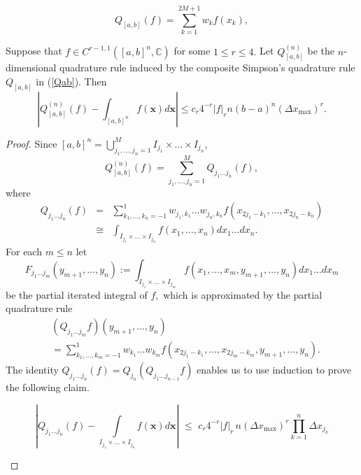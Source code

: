 \documentclass[10pt,a4paper]{amsart}
\begin{document}
\begin{equation}\label{Qab}
    Q_{[a,b]}(f) = \sum_{k=1}^{2M+1} w_k f(x_k),
\end{equation}

\begin{thm}\label{thmcompbound}
Suppose that $f \in C^{r-1,1}([a,b]^n,\mathbb C)$ for some $1\leq r \leq 4.$ Let $Q_{[a,b]}^{(n)}$ be the $n$-dimensional quadrature rule induced by the composite Simpson's quadrature rule $Q_{[a,b]}$ in (\ref{Qab}). Then
\begin{equation}
 \left| Q_{[a,b]}^{(n)}(f) - \int_{[a,b]^n} f(\mathbf{x}) d\mathbf{x}  \right| \leq c_r  4^{-r}  |f|_r n(b-a)^n  (\Delta x_{\operatorname{max}})^r.
\end{equation}
\end{thm}

\begin{proof}
Since 
   $ [a,b]^n = \bigcup_{j_1,\dots,j_n=1}^M I_{j_1} \times \dots \times I_{j_n}$,
\begin{equation}\label{Qnfab}
    Q_{[a,b]}^{(n)}(f) = \sum_{j_1, \dots, j_n=1}^M Q_{j_1 \dots j_n}(f),
\end{equation}
where
\begin{eqnarray} \nonumber 
    Q_{j_1 \dots j_n}(f) &=& \sum_{k_1, \dots, k_n = -1}^{1} w_{j_1,k_1} \dots w_{j_n,k_n} f(x_{2j_1 - k_1}, \dots, x_{2j_n - k_n})\\  
    &\cong& \int_{I_{j_1}\times \dots \times I_{j_n}} f(x_1,\dots, x_n) dx_1 \dots dx_n.
\end{eqnarray}
For each $m \leq n$ let 
\begin{equation}
    F_{j_1 \dots j_m}(y_{m+1}, \dots, y_n) := \int_{I_{j_1} \times \dots \times I_{j_m}} f(x_1, \dots, x_m, y_{m+1}, \dots, y_n) dx_1 \dots dx_m
\end{equation}
be the partial iterated integral of $f,$ which is approximated by the partial quadrature rule 
\begin{align}
    &(Q_{j_1 \dots j_m} f)(y_{m+1}, \dots, y_n)  
    \nonumber
    \\
    &= \sum_{k_1, \dots, k_m = -1}^1  w_{k_1}\dots w_{k_m} f(x_{2j_1 - k_1}, \dots, x_{2j_m - k_m}, y_{m+1}, \dots, y_n).  
\end{align}
The identity $Q_{j_1 \dots j_n}(f)  = Q_{j_n} (Q_{j_1 \dots j_{n-1}} f)$
enables us to use  induction to prove the following claim. 

\begin{claim}
\begin{equation}\label{anclaim}
    \left|  Q_{j_1 \dots j_n}(f) - \int\limits_{I_{j_1} \times \dots \times I_{j_n}}  f(\mathbf x) d\mathbf{x}   \right| 
     \,\,\leq\,\,
     c_r 4^{-r}|f|_r \,n     (\Delta x_{\operatorname{max}})^{r}  
     \prod\limits_{k=1}^n \Delta x_{j_k}
\end{equation}
\end{claim}


\end{proof}
\end{document}
